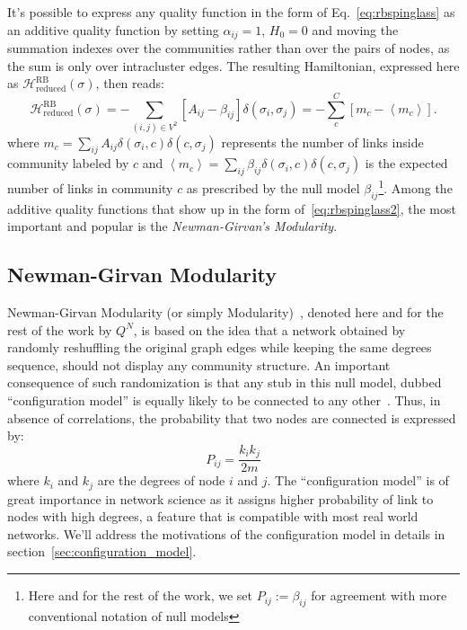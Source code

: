 It's possible to express any quality function in the form of Eq.~\ref{eq:rbspinglass} as an additive quality function by setting $\alpha_{ij}=1$, $H_0=0$ and moving the summation indexes over the communities rather than over the pairs of nodes, as the sum is only over intracluster edges. The resulting Hamiltonian, expressed here as $\mathcal{H}^{\textrm{RB}}_{\textrm{reduced}}(\sigma)$, then reads:
\begin{equation}\label{eq:rbspinglass2}
\mathcal{H}^{\textrm{RB}}_{\textrm{reduced}}(\sigma) = -\sum_{(i,j) \in V^2} \left[ A_{ij} - \beta_{ij} \right] \delta(\sigma_i,\sigma_j) = - \sum \limits_{c}^C \left[ m_c - \left< m_c \right> \right].
\end{equation}
where $m_c=\sum_{ij}A_{ij}\delta(\sigma_i,c)\delta(c,\sigma_j)$ represents the number of links inside community labeled by $c$ and $\left <m_c \right >=\sum_{ij}\beta_{ij}\delta(\sigma_i,c)\delta(c,\sigma_j)$ is the expected number of links in community $c$ as prescribed by the null model $\beta_{ij}$\footnote{Here and for the rest of the work, we set $P_{ij}:=\beta_{ij}$ for agreement with more conventional notation of null models}. 
Among the additive quality functions that show up in the form of~\ref{eq:rbspinglass2}, the most important and popular is the \emph{Newman-Girvan's Modularity}.

\subsection{Newman-Girvan Modularity}\label{sec:newman_modularity}
Newman-Girvan Modularity (or simply Modularity)~\cite{newman2006}, denoted here and for the rest of the work by $Q^N$, is based on the idea that a network obtained by randomly reshuffling the original graph edges while keeping the same degrees sequence, should not display any community structure. 
An important consequence of such randomization is that any stub in this null model, dubbed ``configuration model'' is equally likely to be connected to any other~\cite{newman2010networks}. Thus, in absence of correlations, the probability that two nodes are connected is expressed by:
\begin{equation}\label{eq:configuration_model}
P_{ij} = \frac{k_i k_j}{2m}
\end{equation}
where $k_i$ and $k_j$ are the degrees of node $i$ and $j$. The ``configuration model''  is of great importance in network science as it assigns higher probability of link to nodes with high degrees, a feature that is compatible with most real world networks. 
We'll address the motivations of the configuration model in  details in section~\ref{sec:configuration_model}.


